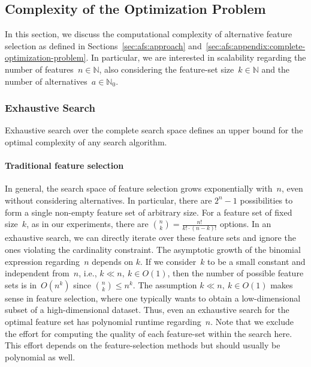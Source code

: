 \documentclass{article}
\theoremstyle{definition}
\begin{document}
\subsection{Complexity of the Optimization Problem}
\label{sec:afs:appendix:complexity}

In this section, we discuss the computational complexity of alternative feature selection as defined in Sections~\ref{sec:afs:approach} and~\ref{sec:afs:appendix:complete-optimization-problem}.
In particular, we are interested in scalability regarding the number of features~$n \in \mathbb{N}$, also considering the feature-set size~$k \in \mathbb{N}$ and the number of alternatives~$a \in \mathbb{N}_0$.

\subsubsection{Exhaustive Search}
\label{sec:afs:appendix:complexity:exhaustive}

Exhaustive search over the complete search space defines an upper bound for the optimal complexity of any search algorithm.

\paragraph{Traditional feature selection}

In general, the search space of feature selection grows exponentially with~$n$, even without considering alternatives.
In particular, there are $2^n - 1$ possibilities to form a single non-empty feature set of arbitrary size.
For a feature set of fixed size~$k$, as in our experiments, there are $\binom{n}{k} = \frac{n!}{k! \cdot (n-k)!}$ options.
In an exhaustive search, we can directly iterate over these feature sets and ignore the ones violating the cardinality constraint.
The asymptotic growth of the binomial expression regarding~$n$ depends on $k$.
If we consider~$k$ to be a small constant and independent from~$n$, i.e., $k \ll n,~k \in O(1)$, then the number of possible feature sets is in~$O(n^k)$ since $\binom{n}{k} \leq n^k$.
The assumption $k \ll n,~k \in O(1)$ makes sense in feature selection, where one typically wants to obtain a low-dimensional subset of a high-dimensional dataset.
Thus, even an exhaustive search for the optimal feature set has polynomial runtime regarding~$n$.
Note that we exclude the effort for computing the quality of each feature-set within the search here.
This effort depends on the feature-selection methods but should usually be polynomial as well.
\end{document}
